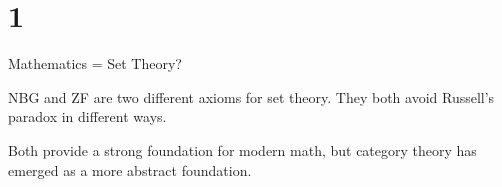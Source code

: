 \documentclass[12pt]{letter}
\begin{document}
\chapter{1}{Mathematics = Set Theory?}

NBG and ZF are two different axioms for set theory. They both avoid Russell's paradox in different ways.

Both provide a strong foundation for modern math, but category theory has emerged as a more abstract foundation.
\end{document}
